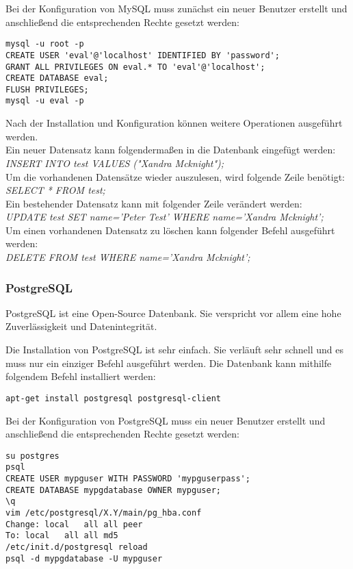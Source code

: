 \newpage

Bei der Konfiguration von MySQL muss zunächst ein neuer Benutzer erstellt und anschließend die entsprechenden Rechte gesetzt werden:
\begin{lstlisting}[caption=Konfiguration von MySQL \cite{ADDUSERMYSQL}]
mysql -u root -p
CREATE USER 'eval'@'localhost' IDENTIFIED BY 'password';
GRANT ALL PRIVILEGES ON eval.* TO 'eval'@'localhost';
CREATE DATABASE eval;
FLUSH PRIVILEGES;
mysql -u eval -p
\end{lstlisting}

Nach der Installation und Konfiguration können weitere Operationen ausgeführt werden.\\
Ein neuer Datensatz kann folgendermaßen in die Datenbank eingefügt werden:\\
\textit{INSERT INTO test VALUES ("Xandra Mcknight");}\\
Um die vorhandenen Datensätze wieder auszulesen, wird folgende Zeile benötigt:\\
\textit{SELECT * FROM test;}\\
Ein bestehender Datensatz kann mit folgender Zeile verändert werden:\\
\textit{UPDATE test SET name='Peter Test' WHERE name='Xandra Mcknight';}\\
Um einen vorhandenen Datensatz zu löschen kann folgender Befehl ausgeführt werden:\\
\textit{DELETE FROM test WHERE name='Xandra Mcknight';}

\subsubsection{PostgreSQL}
PostgreSQL ist eine Open-Source Datenbank. Sie verspricht vor allem eine hohe Zuverlässigkeit und Datenintegrität.\cite{ABOUTPOSTGRES}

Die Installation von PostgreSQL ist sehr einfach. Sie verläuft sehr schnell und es muss nur ein einziger Befehl ausgeführt werden. Die Datenbank kann mithilfe folgendem Befehl installiert werden:
\begin{lstlisting}[caption=Installation von PostgreSQL \cite{POSTGRES}]
apt-get install postgresql postgresql-client
\end{lstlisting}

\newpage

Bei der Konfiguration von PostgreSQL muss ein neuer Benutzer erstellt und anschließend die entsprechenden Rechte gesetzt werden:
\begin{lstlisting}[caption=Konfiguration von PostgreSQL \cite{POSTGRES}]
su postgres
psql
CREATE USER mypguser WITH PASSWORD 'mypguserpass';
CREATE DATABASE mypgdatabase OWNER mypguser;
\q
vim /etc/postgresql/X.Y/main/pg_hba.conf
Change: local	all	all	peer
To: local	all	all	md5
/etc/init.d/postgresql reload
psql -d mypgdatabase -U mypguser
\end{lstlisting}

